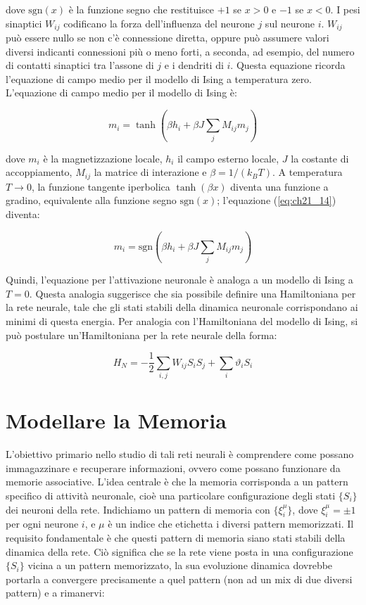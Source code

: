 dove $\text{sgn}(x)$ è la funzione segno che restituisce $+1$ se $x > 0$ e $-1$ se $x < 0$.
I pesi sinaptici $W_{ij}$ codificano la forza dell'influenza del neurone $j$ sul neurone $i$. $W_{ij}$ può essere nullo se non c'è connessione diretta, oppure può assumere valori diversi indicanti connessioni più o meno forti, a seconda, ad esempio, del numero di contatti sinaptici tra l'assone di $j$ e i dendriti di $i$.
Questa equazione ricorda l'equazione di campo medio per il modello di Ising a temperatura zero.
L'equazione di campo medio per il modello di Ising è:

\begin{equation} \label{eq:ch21_14}
m_i = \tanh\left(\beta h_i + \beta J \sum_j M_{ij}m_j\right)
\end{equation}

dove $m_i$ è la magnetizzazione locale, $h_i$ il campo esterno locale, $J$ la costante di accoppiamento, $M_{ij}$ la matrice di interazione e $\beta = 1/(k_B T)$.
A temperatura $T \to 0$, la funzione tangente iperbolica $\tanh(\beta x)$ diventa una funzione a gradino, equivalente alla funzione segno $\text{sgn}(x)$; l'equazione (\ref{eq:ch21_14}) diventa:

\begin{equation} \label{eq:ch21_15}
m_i = \text{sgn} \left(\beta h_i + \beta J \sum_j M_{ij}m_j\right)
\end{equation}

Quindi, l'equazione per l'attivazione neuronale è analoga a un modello di Ising a $T=0$.
Questa analogia suggerisce che sia possibile definire una Hamiltoniana per la rete neurale, tale che gli stati stabili della dinamica neuronale corrispondano ai minimi di questa energia.
Per analogia con l'Hamiltoniana del modello di Ising, si può postulare un'Hamiltoniana per la rete neurale della forma:

\begin{equation} \label{eq:ch21_16}
H_N = -\frac{1}{2}\sum_{i, j} W_{ij}S_iS_j + \sum_i \vartheta_i S_i
\end{equation}


\section{Modellare la Memoria}
L'obiettivo primario nello studio di tali reti neurali è comprendere come possano immagazzinare e recuperare informazioni, ovvero come possano funzionare da memorie associative.
L'idea centrale è che la memoria corrisponda a un pattern specifico di attività neuronale, cioè una particolare configurazione degli stati $\{S_i\}$ dei neuroni della rete.
Indichiamo un pattern di memoria con $\{\xi_i^\mu\}$, dove $\xi_i^\mu = \pm 1$ per ogni neurone $i$, e $\mu$ è un indice che etichetta i diversi pattern memorizzati.
Il requisito fondamentale è che questi pattern di memoria siano stati stabili della dinamica della rete. Ciò significa che se la rete viene posta in una configurazione $\{S_i\}$ vicina a un pattern memorizzato, la sua evoluzione dinamica dovrebbe portarla a convergere precisamente a quel pattern (non ad un mix di due diversi pattern) e a rimanervi:

